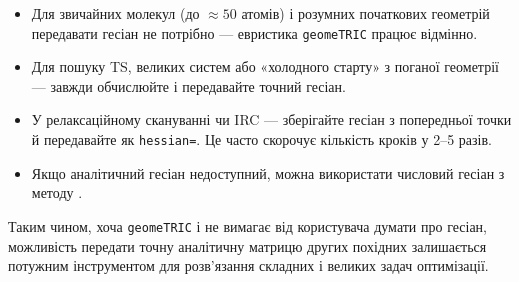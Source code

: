 \begin{itemize}
    \item Для звичайних молекул (до $\approx 50$ атомів) і розумних початкових геометрій передавати гесіан не потрібно --- евристика \texttt{geomeTRIC} працює відмінно.
    \item Для пошуку TS, великих систем або «холодного старту» з поганої геометрії --- завжди обчислюйте і передавайте точний гесіан.
    \item У релаксаційному скануванні чи IRC --- зберігайте гесіан з попередньої точки й передавайте як \texttt{hessian=}. Це часто скорочує кількість кроків у 2–5 разів.
    \item Якщо аналітичний гесіан недоступний, можна використати числовий гесіан з методу .
\end{itemize}

Таким чином, хоча \texttt{geomeTRIC} і не вимагає від користувача думати про гесіан, можливість передати точну аналітичну матрицю других похідних залишається потужним інструментом для розв’язання складних і великих задач оптимізації.